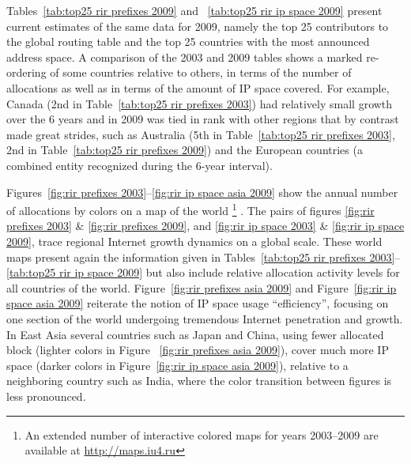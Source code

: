 Tables~\ref{tab:top25 rir prefixes 2009} and ~\ref{tab:top25 rir ip space 2009}
present current estimates of the same data for 2009, namely the top 25
contributors to the global routing table and the top 25 countries with the most
announced address space. A comparison of the 2003 and 2009 tables shows a
marked re-ordering of some countries relative to others, in terms of the number
of allocations as well as in terms of the amount of IP space covered. For
example, Canada (2nd in Table~\ref{tab:top25 rir prefixes 2003}) had relatively
small growth over the 6 years and in 2009 was tied in rank with other regions
that by contrast made great strides, such as Australia (5th in
Table~\ref{tab:top25 rir prefixes 2003}, 2nd in Table~\ref{tab:top25 rir
prefixes 2009}) and the European countries (a combined entity recognized during
the 6-year interval).

Figures~\ref{fig:rir prefixes 2003}--\ref{fig:rir ip space asia 2009} show the
annual number of allocations by colors on a map of the world%
%
\footnote{%
An extended number of interactive colored maps for years 2003--2009 are
available at \url{http://maps.iu4.ru}}%
%
. The pairs of figures \ref{fig:rir prefixes 2003} \& \ref{fig:rir prefixes
2009}, and \ref{fig:rir ip space 2003} \& \ref{fig:rir ip space 2009}, trace
regional Internet growth dynamics on a global scale. These world maps present
again the information given in Tables~\ref{tab:top25 rir prefixes
2003}--\ref{tab:top25 rir ip space 2009} but also include relative allocation
activity levels for all countries of the world. Figure~\ref{fig:rir prefixes
asia 2009} and Figure~\ref{fig:rir ip space asia 2009} reiterate the notion of
IP space usage ``efficiency'', focusing on one section of the world undergoing
tremendous Internet penetration and growth. In East Asia several countries such
as Japan and China, using fewer allocated block (lighter colors in Figure
~\ref{fig:rir prefixes asia 2009}), cover much more IP space (darker colors in
Figure~\ref{fig:rir ip space asia 2009}), relative to a neighboring country
such as India, where the color transition between figures is less pronounced.
